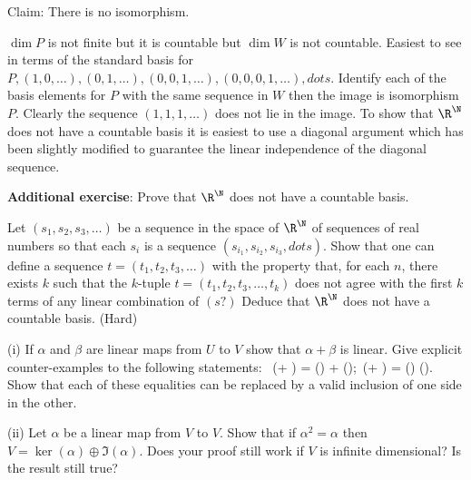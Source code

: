 \begin{solution}[\bf Solution.]
Claim: There is no isomorphism.

$\dim P$ is not finite but it is countable but $\dim W$ is not countable. Easiest to see in terms of the standard basis for $P,(1,0,\dots),(0,1,\dots),(0,0,1,\dots),(0,0,0,1,\dots),dots$. Identify each of the basis elements for $P$ with the same sequence in $W$ then the image is isomorphism $P$. Clearly the sequence $(1,1,1,\dots)$ does not lie in the image. To show that $\R^\N$ does not have a countable basis it is easiest to use a diagonal argument which has been slightly modified to guarantee the linear independence of the diagonal sequence.
\een

{\bf Additional exercise}: Prove that $\R^\N$ does not have a countable basis.

Let $(s_1,s_2,s_3,\dots)$ be a sequence in the space of $\R^\N$ of sequences of real numbers so that each $s_i$ is a sequence $(s_{i_1},s_{i_2},s_{i_3},dots)$. Show that one can define a sequence $t=(t_1,t_2,t_3,\dots)$ with the property that, for each $n$, there exists $k$ such that the $k$-tuple $t=(t_1,t_2,t_3,\dots,t_k)$ does not agree with the first $k$ terms of any linear combination of $(s?)$ Deduce that $\R^\N$ does not have a countable basis. (Hard)
\end{solution}


\begin{problem}

\ben
\item [(i)] If $\alpha$ and $\beta$ are linear maps from $U$ to $V$ show that $\alpha + \beta$ is linear. Give explicit counter-examples to
the following statements:
\be
{}\ \im(\alpha + \beta) = \im(\alpha) + \im(\beta);\quad\quad {}\ \ker(\alpha + \beta) = \ker(\alpha) \cap \ker(\beta).
\ee
Show that each of these equalities can be replaced by a valid inclusion of one side in the other.
\item [(ii)] Let $\alpha$ be a linear map from $V$ to $V$. Show that if $\alpha^2 = \alpha$ then $V = \ker(\alpha)\oplus \Im(\alpha)$. Does your proof still work if $V$ is infinite dimensional? Is the result still true?
\een
\end{problem}

